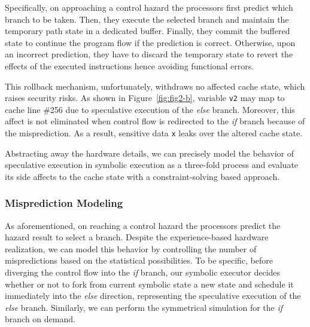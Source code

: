 \documentclass[sigconf, review]{acmart}
\newcommand\ignore[1]{}
\begin{document}
Specifically, on approaching a control hazard the processors first predict which 
branch to be taken. Then, they execute the selected branch and maintain the 
temporary path state in a dedicated buffer. Finally, they commit the buffered 
state to continue the program flow if the prediction is correct. Otherwise, upon 
an incorrect prediction, they have to discard the temporary state to revert the 
effects of the executed instructions hence avoiding functional errors. 


This rollback mechanism, unfortunately, withdraws no affected cache state, which 
raises security risks. As shown in Figure~\ref{fig:fig2-b}, variable \texttt{v2} 
may map to cache line \#256 due to speculative execution of the \textit{else} 
branch. Moreover, this affect is not eliminated when control flow is redirected
to the \textit{if} branch because of the misprediction. As a result, sensitive
data \texttt{x} leaks over the altered cache state. 


Abstracting away the hardware details, we can precisely model the behavior of 
speculative execution in symbolic execution as a three-fold process and evaluate
its side affects to the cache state with a constraint-solving based approach. 


\subsubsection{Misprediction Modeling}
\label{sec:predict_modeling}
As aforementioned, on reaching a control hazard the processors predict the hazard
result to select a branch. Despite the experience-based hardware realization, we 
can model this behavior by controlling the number of mispredictions based on the 
statistical possibilities. To be specific, before diverging the control flow into 
the \textit{if} branch, our symbolic executor decides whether or not to fork from 
current symbolic state a new state and schedule it immediately into the \textit{else} 
direction, representing the speculative execution of the \textit{else} branch. 
Similarly, we can perform the symmetrical simulation for the \textit{if} branch
on demand.

\ignore{
Note that we only model speculative execution at branches where both \textit{if} 
and \textit{else} decisions are feasible in terms of the branch conditions. The 
assumption considers the situation where the hazard is dependent on the computation 
over input and cannot be inferred as a \textit{true} or a \textit{false} value in 
advance. In constrast, if the condition is determined to be \textit{true} or 
\textit{false} at the branch point, e.g., the \textit{while} loop head in Figure
\ref{fig:fig2-a}, then the branch decision is deterministic.
}
\end{document}
